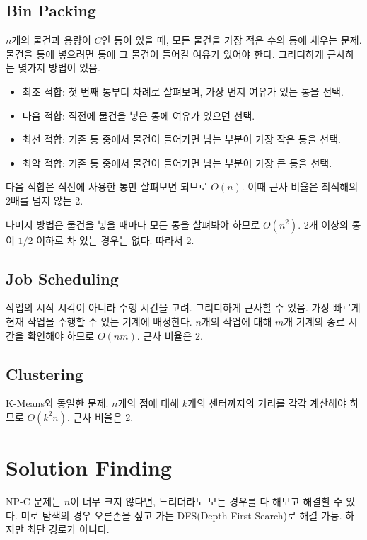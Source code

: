 \subsection{Bin Packing}

$n$개의 물건과 용량이 $C$인 통이 있을 때, 모든 물건을 가장 적은 수의 통에 채우는 문제. 물건을 통에 넣으려면 통에 그 물건이 들어갈 여유가 있어야 한다. 그리디하게 근사하는 몇가지 방법이 있음.

\begin{itemize}
  \item 최초 적합: 첫 번째 통부터 차례로 살펴보며, 가장 먼저 여유가 있는 통을 선택.
  \item 다음 적합: 직전에 물건을 넣은 통에 여유가 있으면 선택.
  \item 최선 적합: 기존 통 중에서 물건이 들어가면 남는 부분이 가장 작은 통을 선택.
  \item 최악 적합: 기존 통 중에서 물건이 들어가면 남는 부분이 가장 큰 통을 선택.
\end{itemize}

다음 적합은 직전에 사용한 통만 살펴보면 되므로 $O(n)$. 이때 근사 비율은 최적해의 2배를 넘지 않는 2.

나머지 방법은 물건을 넣을 때마다 모든 통을 살펴봐야 하므로 $O(n^2)$. 2개 이상의 통이 $1 / 2$ 이하로 차 있는 경우는 없다. 따라서 2.

\subsection{Job Scheduling}

작업의 시작 시각이 아니라 수행 시간을 고려. 그리디하게 근사할 수 있음. 가장 빠르게 현재 작업을 수행할 수 있는 기계에 배정한다. $n$개의 작업에 대해 $m$개 기계의 종료 시간을 확인해야 하므로 $O(nm)$. 근사 비율은 2.

\subsection{Clustering}

K-Means와 동일한 문제. $n$개의 점에 대해 $k$개의 센터까지의 거리를 각각 계산해야 하므로 $O(k^2 n)$. 근사 비율은 2.

\section{Solution Finding}

NP-C 문제는 $n$이 너무 크지 않다면, 느리더라도 모든 경우를 다 해보고 해결할 수 있다. 미로 탐색의 경우 오른손을 짚고 가는 DFS(Depth First Search)로 해결 가능. 하지만 최단 경로가 아니다.

